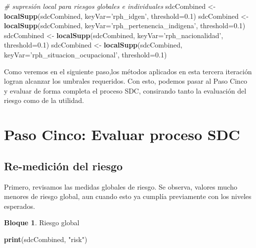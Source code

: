 \documentclass[]{book}
\newenvironment{Shaded}{\begin{snugshade}}{\end{snugshade}}
\newcommand{\CommentTok}[1]{\textcolor[rgb]{0.56,0.35,0.01}{\textit{#1}}}
\newcommand{\DataTypeTok}[1]{\textcolor[rgb]{0.13,0.29,0.53}{#1}}
\newcommand{\FloatTok}[1]{\textcolor[rgb]{0.00,0.00,0.81}{#1}}
\newcommand{\KeywordTok}[1]{\textcolor[rgb]{0.13,0.29,0.53}{\textbf{#1}}}
\newcommand{\NormalTok}[1]{#1}
\newcommand{\StringTok}[1]{\textcolor[rgb]{0.31,0.60,0.02}{#1}}
\theoremstyle{definition}
\theoremstyle{definition}
\newtheorem{example}{Bloque}[chapter]
\theoremstyle{definition}
\theoremstyle{definition}
\theoremstyle{remark}
\begin{document}
\begin{Shaded}
\begin{Highlighting}[]
\CommentTok{# supresión local para riesgos globales e individuales}
\NormalTok{sdcCombined <-}\StringTok{ }\KeywordTok{localSupp}\NormalTok{(sdcCombined, }\DataTypeTok{keyVar=}\StringTok{'rph_idgen'}\NormalTok{, }\DataTypeTok{threshold=}\FloatTok{0.1}\NormalTok{)}
\NormalTok{sdcCombined <-}\StringTok{ }\KeywordTok{localSupp}\NormalTok{(sdcCombined, }\DataTypeTok{keyVar=}\StringTok{'rph_pertenencia_indigena'}\NormalTok{, }\DataTypeTok{threshold=}\FloatTok{0.1}\NormalTok{)}
\NormalTok{sdcCombined <-}\StringTok{ }\KeywordTok{localSupp}\NormalTok{(sdcCombined, }\DataTypeTok{keyVar=}\StringTok{'rph_nacionalidad'}\NormalTok{, }\DataTypeTok{threshold=}\FloatTok{0.1}\NormalTok{)}
\NormalTok{sdcCombined <-}\StringTok{ }\KeywordTok{localSupp}\NormalTok{(sdcCombined, }\DataTypeTok{keyVar=}\StringTok{'rph_situacion_ocupacional'}\NormalTok{, }\DataTypeTok{threshold=}\FloatTok{0.1}\NormalTok{)}
\end{Highlighting}
\end{Shaded}

Como veremos en el siguiente paso,los métodos aplicados en esta tercera iteración logran alcanzar los umbrales requeridos. Con esto, podemos pasar al Paso Cinco y evaluar de forma completa el proceso SDC, consirando tanto la evaluación del riesgo como de la utilidad.

\hypertarget{paso-cinco-evaluar-proceso-sdc}{%
\section{Paso Cinco: Evaluar proceso SDC}\label{paso-cinco-evaluar-proceso-sdc}}

\hypertarget{re-mediciuxf3n-del-riesgo}{%
\subsection{Re-medición del riesgo}\label{re-mediciuxf3n-del-riesgo}}

Primero, revisamos las medidas globales de riesgo. Se observa, valores mucho menores de riesgo global, aun cuando esto ya cumplía previamente con los niveles esperados.

\begin{example}
\protect\hypertarget{exm:bloque66nbm}{}{\label{exm:bloque66nbm} }Riesgo global
\end{example}

\begin{Shaded}
\begin{Highlighting}[]
\KeywordTok{print}\NormalTok{(sdcCombined, }\StringTok{"risk"}\NormalTok{)}
\end{Highlighting}
\end{Shaded}
\end{document}

